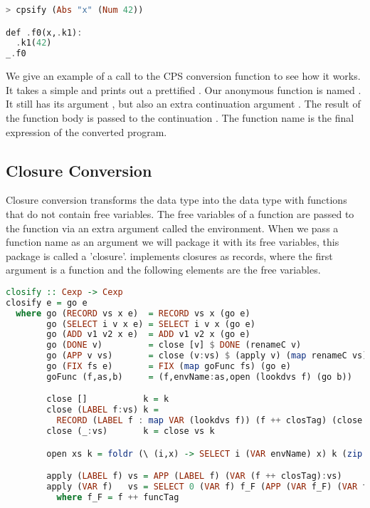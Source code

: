 {\begin{lstlisting}[language=Haskell]
> cpsify (Abs "x" (Num 42))

def .f0(x,.k1):
  .k1(42)
_.f0
\end{lstlisting}

We give an example of a call to the \ac{CPS} conversion function to see how it works. It takes a simple  and prints out a prettified . Our anonymous function is named . It still has its argument , but also an extra continuation argument . The result of the function body is passed to the continuation . The function name is the final expression of the converted program.

\subsection{\label{section:closconvert}Closure Conversion}
Closure conversion transforms the  data type into the  data type with functions that do not contain free variables. The free variables of a function are passed to the function via an extra argument called the environment. When we pass a function name as an argument we will package it with its free variables, this package is called a 'closure'.  implements closures as records, where the first argument is a function  and the following elements are the free variables.

\begin{lstlisting}[language=Haskell]
closify :: Cexp -> Cexp
closify e = go e
  where go (RECORD vs x e)  = RECORD vs x (go e)
        go (SELECT i v x e) = SELECT i v x (go e)
        go (ADD v1 v2 x e)  = ADD v1 v2 x (go e)
        go (DONE v)         = close [v] $ DONE (renameC v)
        go (APP v vs)       = close (v:vs) $ (apply v) (map renameC vs)
        go (FIX fs e)       = FIX (map goFunc fs) (go e)
        goFunc (f,as,b)     = (f,envName:as,open (lookdvs f) (go b))

        close []           k = k
        close (LABEL f:vs) k =
          RECORD (LABEL f : map VAR (lookdvs f)) (f ++ closTag) (close vs k)
        close (_:vs)       k = close vs k

        open xs k = foldr (\ (i,x) -> SELECT i (VAR envName) x) k (zip [1..] xs)

        apply (LABEL f) vs = APP (LABEL f) (VAR (f ++ closTag):vs)
        apply (VAR f)   vs = SELECT 0 (VAR f) f_F (APP (VAR f_F) (VAR f:vs))
          where f_F = f ++ funcTag
\end{lstlisting}

}
